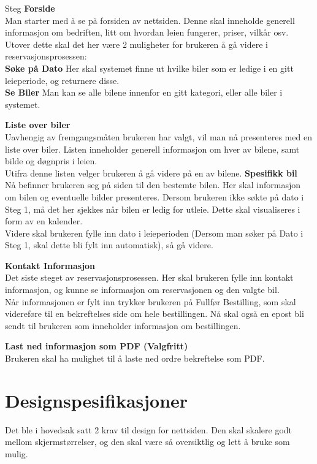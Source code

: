 \begin{steps}{Steg}
\step \textbf{Forside}\\Man starter med å se på forsiden av nettsiden. Denne skal inneholde generell informasjon om bedriften, litt om hvordan leien fungerer, priser, vilkår osv. Utover dette skal det her være 2 muligheter for brukeren å gå videre i reservasjonsprosessen:\\
\textbf{Søke på Dato} Her skal systemet finne ut hvilke biler som er ledige i en gitt leieperiode, og returnere disse. \\
\textbf{Se Biler} Man kan se alle bilene innenfor en gitt kategori, eller alle biler i systemet.

\step \textbf{Liste over biler}\\Uavhengig av fremgangsmåten brukeren har valgt, vil man nå presenteres med en liste over biler. Listen inneholder generell informasjon om hver av bilene, samt bilde og døgnpris i leien.\\
Utifra denne listen velger brukeren å gå videre på en av bilene.
\newpage
\step \textbf{Spesifikk bil}\\Nå befinner brukeren seg på siden til den bestemte bilen. Her skal informasjon om bilen og eventuelle bilder presenteres.
Dersom brukeren ikke søkte på dato i Steg 1, må det her sjekkes når bilen er ledig for utleie. Dette skal visualiseres i form av en kalender.\\
Videre skal brukeren fylle inn dato i leieperioden (Dersom man søker på Dato i Steg 1, skal dette bli fylt inn automatisk), så gå videre.

\step \textbf{Kontakt Informasjon}\\Det siste steget av reservasjonsprosessen. Her skal brukeren fylle inn kontakt informasjon, og kunne se informasjon om reservasjonen og den valgte bil.\\
Når informasjonen er fylt inn trykker brukeren på Fullfør Bestilling, som skal videreføre til en bekreftelses side om hele bestillingen. Nå skal også en epost bli sendt til brukeren som inneholder informasjon om bestillingen.

\step \textbf{Last ned informasjon som PDF (Valgfritt)}\\Brukeren skal ha mulighet til å laste ned ordre bekreftelse som PDF.

\end{steps}




\section{Designspesifikasjoner}
Det ble i hovedsak satt 2 krav til design for nettsiden. Den skal skalere godt mellom skjermstørrelser, og den skal være så oversiktlig og lett å bruke som mulig.

